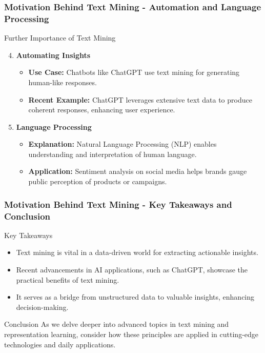 \documentclass[aspectratio=169]{beamer}
\begin{document}
\begin{frame}[fragile]
    \frametitle{Motivation Behind Text Mining - Automation and Language Processing}
    \begin{block}{Further Importance of Text Mining}
        \begin{enumerate}
            \setcounter{enumi}{3} %
            \item \textbf{Automating Insights}
                \begin{itemize}
                    \item \textbf{Use Case:} Chatbots like ChatGPT use text mining for generating human-like responses.
                    \item \textbf{Recent Example:} ChatGPT leverages extensive text data to produce coherent responses, enhancing user experience.
                \end{itemize}
                
            \item \textbf{Language Processing}
                \begin{itemize}
                    \item \textbf{Explanation:} Natural Language Processing (NLP) enables understanding and interpretation of human language.
                    \item \textbf{Application:} Sentiment analysis on social media helps brands gauge public perception of products or campaigns.
                \end{itemize}
        \end{enumerate}
    \end{block}
\end{frame}

\begin{frame}[fragile]
    \frametitle{Motivation Behind Text Mining - Key Takeaways and Conclusion}
    \begin{block}{Key Takeaways}
        \begin{itemize}
            \item Text mining is vital in a data-driven world for extracting actionable insights.
            \item Recent advancements in AI applications, such as ChatGPT, showcase the practical benefits of text mining.
            \item It serves as a bridge from unstructured data to valuable insights, enhancing decision-making.
        \end{itemize}
    \end{block}
    \begin{block}{Conclusion}
        As we delve deeper into advanced topics in text mining and representation learning, consider how these principles are applied in cutting-edge technologies and daily applications.
    \end{block}
\end{frame}
\end{document}
